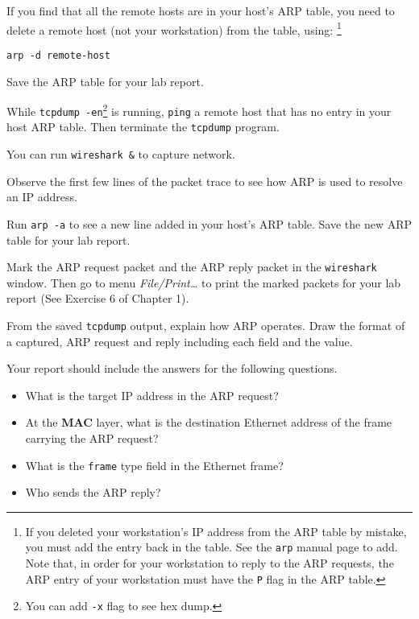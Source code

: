 \documentclass{../UTNetLab}
\begin{document}
    If you find that all the remote hosts are in your host’s ARP table, you need to delete a remote host (not your workstation) from the table, using:
    \footnote{If you deleted your workstation’s IP address from the ARP table by mistake, you must add the entry back in the table. See the \lstinline{arp} manual page to add.
    Note that, in order for your workstation to reply to the ARP requests, the ARP entry of your workstation must have the \lstinline{P} flag in the ARP table.}
    \begin{lstlisting}[emph={remote-host}]
arp -d remote-host
    \end{lstlisting}

    Save the ARP table for your lab report.
    
    While \lstinline{tcpdump -en}\footnote{You can add \lstinline{-x} flag to see hex dump.} is running, \lstinline{ping} a remote host that has no entry in your host ARP table.
    Then terminate the \lstinline{tcpdump} program.

    You can run \lstinline{wireshark &} to capture network.

    Observe the first few lines of the packet trace to see how ARP is used to resolve an IP address.

    Run \lstinline{arp -a} to see a new line added in your host’s ARP table.
    Save the new ARP table for your lab report.

    Mark the ARP request packet and the ARP reply packet in the \lstinline{wireshark} window.
    Then go to menu \textit{File/Print\ldots} to print the marked packets for your lab report (See Exercise 6 of Chapter 1).

    \begin{report}
    \item From the saved \lstinline{tcpdump} output, explain how ARP operates.
    Draw the format of a captured, ARP request and reply including each field and the value.
    \end{report}

    Your report should include the answers for the following questions.
    \begin{itemize}
        \item What is the target IP address in the ARP request?
        \item At the \textbf{MAC} layer, what is the destination Ethernet address of the frame carrying the ARP request?
        \item What is the \texttt{frame} type field in the Ethernet frame?
        \item Who sends the ARP reply?
    \end{itemize}
\end{document}
